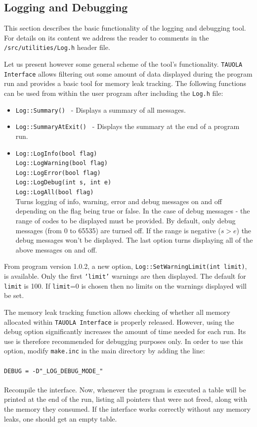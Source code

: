 \documentclass[]{Tauola_interface_design}
\begin{document}
\subsection{Logging and Debugging}
This section describes the basic functionality of the logging and debugging tool.
For details on its content
 we address the reader  to comments in the {\tt /src/utilities/Log.h} header file.

Let us present however some general scheme of the tool's functionality.
{\tt TAUOLA Interface} allows filtering out some amount of data displayed during the program run
and provides a basic tool for memory leak tracking. The following functions
can be used from within the user program after including the {\tt Log.h} file:
\begin{itemize}
  \item {\tt Log::Summary() } - Displays a summary of all messages.
  \item {\tt Log::SummaryAtExit() } - Displays the summary at the end of a program run.
  \item {\tt Log::LogInfo(bool flag) } \\
        {\tt Log::LogWarning(bool flag) } \\
        {\tt Log::LogError(bool flag) } \\
        {\tt Log::LogDebug(int s, int e) } \\
        {\tt Log::LogAll(bool flag)} \\
        Turns logging of info, warning, error and debug messages on and off depending
        on the flag being true or false. In the case of debug messages - the range of codes
        to be displayed must be provided. By default, only debug messages
        (from 0 to 65535) are turned off. If the range is negative ($s>e$) the debug messages
        won't be displayed. The last option turns displaying all of the above messages on and off.
\end{itemize}

From program version 1.0.2, a new option, {\tt Log::SetWarningLimit(int limit)}, is available.
Only the first {\tt `limit'} warnings are then displayed. The default for {\tt limit} is 100. 
If {\tt limit}=0 is chosen then  no limits on the warnings displayed will be set.

The memory leak tracking function allows checking of whether all memory allocated within {\tt TAUOLA Interface}
 is properly released. However, using the debug option significantly increases the amount of time needed for 
each run. Its  use is therefore recommended  for debugging purposes only. In order to use this option,
 modify {\tt make.inc} in the main directory by adding the line: \\
\\ {\tt DEBUG = -D"\_LOG\_DEBUG\_MODE\_" } \\ \\
Recompile the interface.
Now, whenever the program is executed 
a table will be printed at the end of the run, listing all pointers that were not freed, along with the memory they consumed.
If the interface
works correctly without any memory leaks, one should get an empty table.
\end{document}
